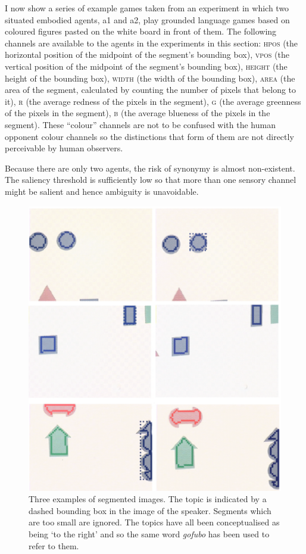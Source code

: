 I now show a series of example games taken from 
an experiment in which two situated embodied agents,
{\bfshape a1} and {\bfshape a2}, play grounded language games based on 
coloured figures pasted on the white board in front
of them. The following channels are available to the agents 
in the experiments in this section: 
\textsc{hpos} (the horizontal position of the midpoint 
of the segment's bounding box), 
\textsc{vpos} (the vertical position of the midpoint of the segment's 
bounding box), \textsc{height} (the height of the bounding box), 
\textsc{width} (the width of the bounding box), \textsc{area}
(the area of the segment, calculated
by counting the number of pixels that belong to it), 
\textsc{r} (the average redness of the pixels in the segment), 
\textsc{g} (the average greenness of the pixels in the segment), 
\textsc{b} (the average blueness of the pixels in the segment). 
These ``colour'' channels are not to be confused with the 
human opponent colour channels so the distinctions 
that form of them are not directly perceivable by 
human observers.

Because there are only two agents, the 
risk of synonymy is almost non-existent. The saliency 
threshold is sufficiently low so that more than one
sensory channel might be salient and hence ambiguity
is unavoidable. 

\begin{figure}
\begin{center}
\includegraphics[width=0.8\columnwidth]{chap7/figs/plate-10.pdf}
\end{center}
\caption{Three examples of segmented images. The 
topic is indicated by a dashed bounding box in the 
image of the speaker. Segments which are too small 
are ignored. The topics have all been conceptualised
as being `to the right' and so the same word 
\textit{gofubo} has been used to refer to them. }
\label{fig:plate-10}
\end{figure}

